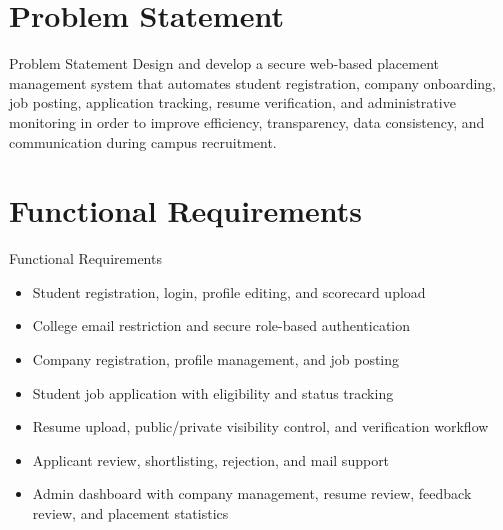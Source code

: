 \documentclass{beamer}
\begin{document}
\section{Problem Statement}
\begin{frame}{Problem Statement}
\justifying
Design and develop a secure web-based placement management system that automates
student registration, company onboarding, job posting, application tracking,
resume verification, and administrative monitoring in order to improve efficiency,
transparency, data consistency, and communication during campus recruitment.
\end{frame}

\section{Functional Requirements}
\begin{frame}{Functional Requirements}
\begin{itemize}
\item Student registration, login, profile editing, and scorecard upload
\item College email restriction and secure role-based authentication
\item Company registration, profile management, and job posting
\item Student job application with eligibility and status tracking
\item Resume upload, public/private visibility control, and verification workflow
\item Applicant review, shortlisting, rejection, and mail support
\item Admin dashboard with company management, resume review, feedback review, and placement statistics
\end{itemize}
\end{frame}
\end{document}
